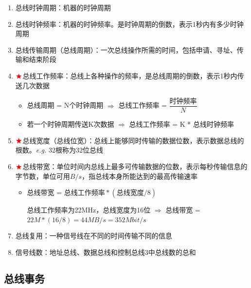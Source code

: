 \documentclass[./computer-organization-and-architecture.tex]{subfiles}
\begin{document}
    \begin{enumerate}
        \item 总线时钟周期：机器的时钟周期
        \item 总线时钟频率：机器的时钟频率。是时钟周期的倒数，表示1秒内有多少时钟周期
        \item 总线传输周期（总线周期）：一次总线操作所需的时间，包括申请、寻址、传输和结束阶段
        \item $\color{red}{\bigstar}$总线工作频率：总线上各种操作的频率，是总线周期的倒数，表示1秒内传送几次数据
        \begin{itemize}
            \item 总线周期 = N个时钟周期 $\Rightarrow$ 总线工作频率 = $\dfrac{\text{时钟频率}}{N}$
            \item 若一个时钟周期传送K次数据 $\Rightarrow$ 总线工作频率 = K * 总线时钟频率
        \end{itemize}
        \item $\color{red}{\bigstar}$总线宽度（总线位宽）：总线上能够同时传输的数据位数，表示数据总线的根数。\emph{e.g.} 32根称为32位总线
        \item $\color{red}{\bigstar}$总线带宽：单位时间内总线上最多可传输数据的位数，表示每秒传输信息的字节数，单位可用$B/s$，指总线本身所能达到的最高传输速率
        \begin{itemize}
            \item 总线带宽 = $\text{总线工作频率} * (\text{总线宽度}/8)$
            \begin{analysisbox}
                总线工作频率为22MHz，总线宽度为16位 $\Rightarrow$ 总线带宽 = $22M * (16/8) = 44MB/s = 352Mbit/s$
            \end{analysisbox}
        \end{itemize}
        \item 总线复用：一种信号线在不同的时间传输不同的信息
        \item 信号线数：地址总线、数据总线和控制总线3中总线数的总和
    \end{enumerate}

    \subsection{总线事务}
\end{document}

